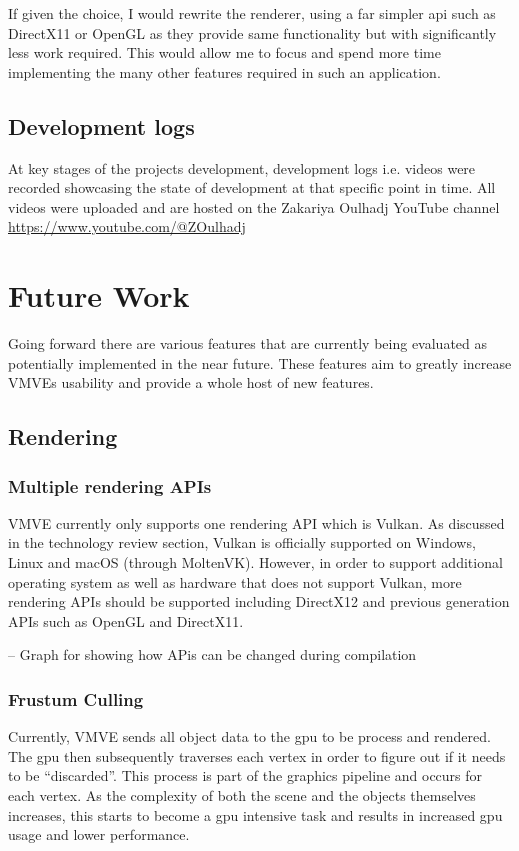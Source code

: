\documentclass[11pt]{article}
\begin{document}
If given the choice, I would rewrite the renderer, using a far simpler \gls{api}
such as DirectX11 or OpenGL as they provide same functionality but with
significantly less work required. This would allow me to focus and spend more time 
implementing the many other features required in such an application.

\subsection{Development logs}
At key stages of the projects development, development logs i.e. videos were
recorded showcasing the state of development at that specific point in time. All
videos were uploaded and are hosted on the Zakariya Oulhadj YouTube channel
\url{https://www.youtube.com/@ZOulhadj}

\section{Future Work}
Going forward there are various features that are currently being evaluated as
potentially implemented in the near future. These features aim to greatly
increase VMVEs usability and provide a whole host of new features.

\subsection{Rendering}

\subsubsection{Multiple rendering APIs}
VMVE currently only supports one rendering API which is Vulkan. As discussed in
the technology review section, Vulkan is officially supported on Windows, Linux
and macOS (through MoltenVK). However, in order to support additional operating
system as well as hardware that does not support Vulkan, more rendering APIs
should be supported including DirectX12 and previous generation APIs such as
OpenGL and DirectX11.

-- Graph for showing how APis can be changed during compilation

\subsubsection{Frustum Culling}
Currently, VMVE sends all object data to the \gls{gpu} to be process and rendered. The
\gls{gpu} then subsequently traverses each vertex in order to figure out if it needs
to be ``discarded''. This process is part of the graphics pipeline and occurs for
each vertex. As the complexity of both the scene and the objects themselves
increases, this starts to become a \gls{gpu} intensive task and results in increased
\gls{gpu} usage and lower performance.
\end{document}
